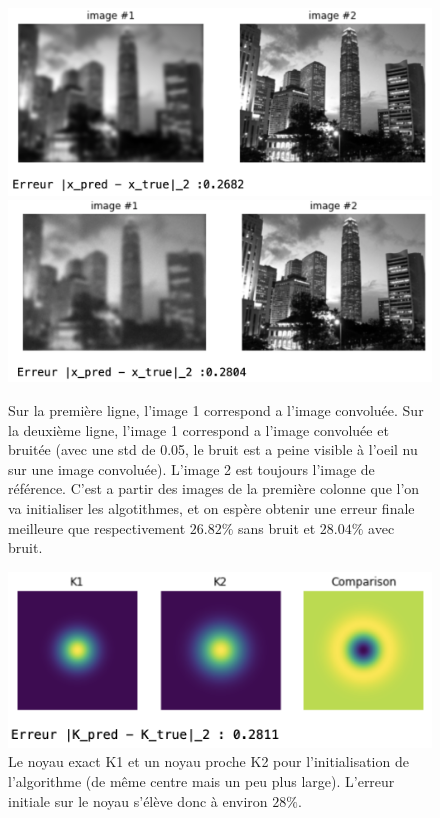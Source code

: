 \documentclass[a4paper]{article}
\begin{document}
\begin{figure}[h]
\includegraphics[scale=0.6]{figures/blurred}
\includegraphics[scale=0.6]{figures/noisy}
\caption{Sur la première ligne, l'image 1 correspond a l'image convoluée. Sur la deuxième ligne, l'image 1 correspond a l'image convoluée et bruitée  (avec une std de 0.05, le bruit est a peine visible à l'oeil nu sur une image convoluée). L'image 2 est toujours l'image de référence. C'est a partir des images de la première colonne que l'on va initialiser les algotithmes, et on espère obtenir une erreur finale meilleure que respectivement $26.82\%$ sans bruit et $28.04\%$ avec bruit.}
\end{figure}
%
\begin{figure}[h]
\includegraphics[scale=0.6]{figures/kernel}
\caption{Le noyau exact K1 et un noyau proche K2 pour l'initialisation de l'algorithme (de même centre mais un peu plus large).
L'erreur initiale sur le noyau s'élève donc à environ $28\%$.}
\end{figure}
\end{document}
